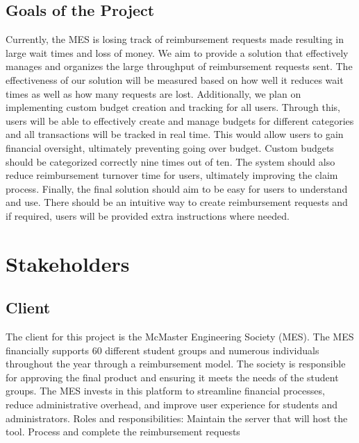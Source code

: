 \documentclass[12pt]{article}
\begin{document}
\subsection{Goals of the Project}
Currently, the MES is losing track of reimbursement requests made resulting in large wait times and loss of money. We aim to provide a solution that effectively manages and organizes the large throughput of reimbursement requests sent. The effectiveness of our solution will be measured based on how well it reduces wait times as well as how many requests are lost.
Additionally, we plan on implementing custom budget creation and tracking for all users. Through this, users will be able to effectively create and manage budgets for different categories and all transactions will be tracked in real time. This would allow users to gain financial oversight, ultimately preventing going over budget. Custom budgets should be categorized correctly nine times out of ten. The system should also reduce reimbursement turnover time for users, ultimately improving the claim process. Finally, the final solution should aim to be easy for users to understand and use. There should be an intuitive way to create reimbursement requests and if required, users will be provided extra instructions where needed.

\section{Stakeholders}
\subsection{Client}
The client for this project is the McMaster Engineering Society (MES). The MES financially supports 60 different student groups and numerous individuals throughout the year through a reimbursement model. The society is responsible for approving the final product and ensuring it meets the needs of the student groups.
The MES invests in this platform to streamline financial processes, reduce administrative overhead, and improve user experience for students and administrators.
Roles and responsibilities: Maintain the server that will host the tool. Process and complete the reimbursement requests
\end{document}
